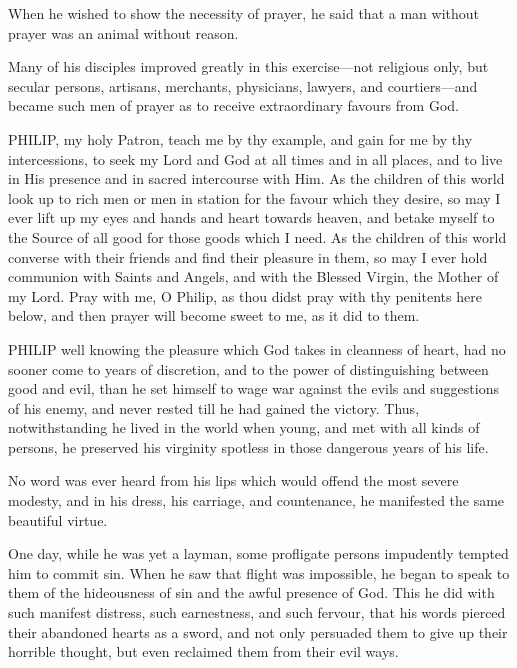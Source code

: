 When he wished to show the
necessity of prayer, he said that a man without prayer was an animal
without reason.

Many of his disciples improved
greatly in this exercise—not religious only, but secular persons,
artisans, merchants, physicians, lawyers, and courtiers—and became
such men of prayer as to receive extraordinary favours from God.


PHILIP, my holy
Patron, teach me by thy example, and gain for me by thy intercessions,
to seek my Lord and God at all times and in all places, and to live in
His presence and in sacred intercourse with Him. As the children of this
world look up to rich men or men in station for the favour which they
desire, so may I ever lift up my eyes and hands and heart towards
heaven, and betake myself to the Source of all good for those goods
which I need. As the children of this world converse with their friends
and find their pleasure in them, so may I ever hold communion with
Saints and Angels, and with the Blessed Virgin, the Mother of my Lord.
Pray with me, O Philip, as thou didst pray with thy penitents here
below, and then prayer will become sweet to me, as it did to them.



PHILIP well knowing
the pleasure which God takes in cleanness of heart, had no sooner come
to years of discretion, and to the power of distinguishing between good
and evil, than he set himself to wage war against the evils and
suggestions of his enemy, and never rested till he had gained the
victory. Thus, notwithstanding he lived in the world when young, and met
with all kinds of persons, he preserved his virginity spotless in those
dangerous years of his life.

No word was ever heard from his
lips which would offend the most severe modesty, and in his dress, his
carriage, and countenance, he manifested the same beautiful virtue.

One day, while he was yet a
layman, some profligate persons impudently tempted him to commit sin.
When he saw that flight was impossible, he began to speak to them of the
hideousness of sin and the awful presence of God. This he did with such
manifest distress, such earnestness, and such fervour, that his
words pierced their abandoned hearts as a sword, and not only persuaded
them to give up their horrible thought, but even reclaimed them from
their evil ways.

